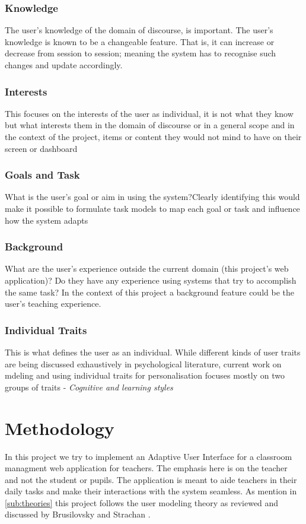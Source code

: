 \subsubsection{Knowledge}
The user's knowledge of the domain of discourse, is important. The user's knowledge is known to be a changeable feature. That is, it can increase or decrease from session to session; meaning the system has to recognise such changes and update accordingly.
\subsubsection{Interests}
This focuses on the interests of the user as individual, it is not what they know but what interests them in the domain of discourse or in a general scope and in the context of the project, items or content they would not mind to have on their screen or dashboard
\subsubsection{Goals and Task}
What is the user's goal or aim in using the system?Clearly identifying this would make it possible to formulate task models to map each goal or task and influence how the system adapts
\subsubsection{Background}
What are the user's experience outside the current domain (this project's web application)? Do they have any experience using systems that try to accomplish the same task? In the context of this project a background feature could be the user's teaching experience.
\subsubsection{Individual Traits}
This is what defines the user as an individual. While different kinds of user traits are being discussed exhaustively in psychological literature, current work on mdeling and using individual traits for personalisation focuses mostly on two groups of traits - \emph{Cognitive and learning styles} \cite{brusilovsky2007user}
\section{Methodology}
In this project we try to implement an Adaptive User Interface for a classroom managment web application for teachers. The emphasis here is on the teacher and not the student or pupils. The application is meant to aide teachers in their daily tasks and make their interactions with the system seamless.
As mention in \ref{sub:theories} this project follows the user modeling theory as reviewed and discussed by Brusilovsky \cite{brusilovsky2007user} and Strachan \cite{strachan2000minimalist}.

